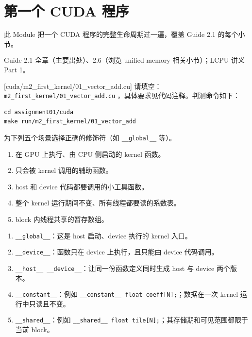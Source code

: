 \documentclass[11pt,a4paper,fontset=none]{ctexart}
\begin{document}
\section{第一个 CUDA 程序}

此 Module 把一个 CUDA 程序的完整生命周期过一遍，覆盖 Guide 2.1 的每个小节。

\begin{reading}
Guide 2.1 全章（主要出处）、2.6（浏览 unified memory 相关小节）；LCPU 讲义 Part 1。
\end{reading}

[cuda/m2\_first\_kernel/01\_vector\_add.cu]
请填空：\texttt{m2\_first\_kernel/01\_vector\_add.cu} ，具体要求见代码注释。判测命令如下：

\begin{lstlisting}
cd assignment01/cuda
make run/m2_first_kernel/01_vector_add
\end{lstlisting}

为下列五个场景选择正确的修饰符（如 \texttt{\_\_global\_\_} 等）。
\begin{enumerate}[label=(\alph*)]
  \item 在 GPU 上执行、由 CPU 侧启动的 kernel 函数。
  \item 只会被 kernel 调用的辅助函数。
  \item host 和 device 代码都要调用的小工具函数。
  \item 整个 kernel 运行期间不变、所有线程都要读的系数表。
  \item block 内线程共享的暂存数组。
\end{enumerate}

\begin{answer}
\begin{enumerate}[label=(\alph*)]
  \item \texttt{\_\_global\_\_}：这是 host 启动、device 执行的 kernel 入口。
  \item \texttt{\_\_device\_\_}：函数只在 device 上执行，且只能由 device 代码调用。
  \item \texttt{\_\_host\_\_ \_\_device\_\_}：让同一份函数定义同时生成 host 与 device 两个版本。
  \item \texttt{\_\_constant\_\_}：例如 \texttt{\_\_constant\_\_ float coeff[N];}；数据在一次 kernel 运行中只读且不变。
  \item \texttt{\_\_shared\_\_}：例如 \texttt{\_\_shared\_\_ float tile[N];}；其存储期和可见范围都限于当前 block。
\end{enumerate}
\end{answer}
\end{document}
